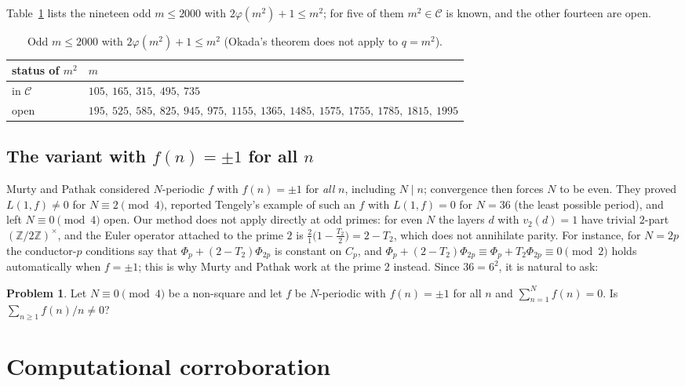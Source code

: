 \documentclass[11pt]{amsart}
\theoremstyle{definition}
\newtheorem{problem}[theorem]{Problem}
\theoremstyle{remark}
\providecommand{\Z}{\mathbb Z}
\numberwithin{equation}{section}
\begin{document}
Table~\ref{tab:squares} lists the nineteen odd $m\le2000$ with $2\varphi(m^2)+1\le m^2$; for five of them $m^2\in\mathcal C$ is known, and the other fourteen are open.

\begin{table}[ht]
\centering
\caption{Odd $m\le2000$ with $2\varphi(m^2)+1\le m^2$ (Okada's theorem does not apply to $q=m^2$).}\label{tab:squares}
\begin{tabular}{@{}ll@{}}
\toprule
status of $m^2$ & $m$\\
\midrule
in $\mathcal C$ \cite{Kei26} & $105,\ 165,\ 315,\ 495,\ 735$\\
open & $195,\ 525,\ 585,\ 825,\ 945,\ 975,\ 1155,\ 1365,\ 1485,\ 1575,\ 1755,\ 1785,\ 1815,\ 1995$\\
\bottomrule
\end{tabular}
\end{table}

\subsection{The variant with \texorpdfstring{$f(n)=\pm1$}{f(n)=+-1} for all \texorpdfstring{$n$}{n}}
Murty and Pathak \cite{MP22} considered $N$-periodic $f$ with $f(n)=\pm1$ for \emph{all} $n$, including $N\mid n$; convergence then forces $N$ to be even.
They proved $L(1,f)\neq0$ for $N\equiv2\pmod4$, reported Tengely's example of such an $f$ with $L(1,f)=0$ for $N=36$ (the least possible period), and left $N\equiv0\pmod 4$ open.
Our method does not apply directly at odd primes: for even $N$ the layers $d$ with $v_2(d)=1$ have trivial $2$-part $(\Z/2\Z)^\times$, and the Euler operator attached to the prime $2$ is $\frac{2}{1}\bigl(1-\frac{T_2}{2}\bigr)=2-T_2$, which does not annihilate parity.
For instance, for $N=2p$ the conductor-$p$ conditions say that $\Phi_p+(2-T_2)\Phi_{2p}$ is constant on $C_p$, and $\Phi_p+(2-T_2)\Phi_{2p}\equiv\Phi_p+T_2\Phi_{2p}\equiv0\pmod 2$ holds automatically when $f=\pm1$; this is why Murty and Pathak work at the prime $2$ instead.
Since $36=6^2$, it is natural to ask:

\begin{problem}
Let $N\equiv0\pmod4$ be a non-square and let $f$ be $N$-periodic with $f(n)=\pm1$ for all $n$ and $\sum_{n=1}^Nf(n)=0$. Is $\sum_{n\ge1}f(n)/n\neq0$?
\end{problem}
\section{Computational corroboration}\label{sec:computations}
\end{document}
